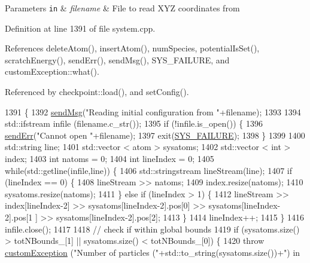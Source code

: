 \begin{DoxyParams}[1]{Parameters}
\mbox{\tt in}  & {\em filename} & File to read X\-Y\-Z coordinates from \\
\hline
\end{DoxyParams}


Definition at line 1391 of file system.\-cpp.



References delete\-Atom(), insert\-Atom(), num\-Species, potential\-Is\-Set(), scratch\-Energy(), send\-Err(), send\-Msg(), S\-Y\-S\-\_\-\-F\-A\-I\-L\-U\-R\-E, and custom\-Exception\-::what().



Referenced by checkpoint\-::load(), and set\-Config().


\begin{DoxyCode}
1391                                               \{
1392     \hyperlink{utilities_8cpp_a08974c73a5b36c28b8ad1ef47fca77b0}{sendMsg}(\textcolor{stringliteral}{"Reading initial configuration from "}+filename);
1393 
1394     std::ifstream infile (filename.c\_str());
1395     \textcolor{keywordflow}{if} (!infile.is\_open()) \{
1396         \hyperlink{utilities_8cpp_a6dacf3c3c19aa1e13a4d5a148fe5114e}{sendErr}(\textcolor{stringliteral}{"Cannot open "}+filename);
1397         exit(\hyperlink{global_8h_a428dfe1ef0a6ff4b1fdebf275f6aff2e}{SYS\_FAILURE});
1398     \}
1399 
1400     std::string line;
1401     std::vector < atom > sysatoms;
1402     std::vector < int > index;
1403     \textcolor{keywordtype}{int} natoms = 0;
1404     \textcolor{keywordtype}{int} lineIndex = 0;
1405     \textcolor{keywordflow}{while}(std::getline(infile,line)) \{
1406         std::stringstream lineStream(line);
1407         \textcolor{keywordflow}{if} (lineIndex == 0) \{
1408             lineStream >> natoms;
1409             index.resize(natoms);
1410             sysatoms.resize(natoms);
1411         \} \textcolor{keywordflow}{else} \textcolor{keywordflow}{if} (lineIndex > 1) \{
1412             lineStream >> index[lineIndex-2] >> sysatoms[lineIndex-2].pos[0] >> sysatoms[lineIndex-2].pos[1
      ] >> sysatoms[lineIndex-2].pos[2];
1413         \}
1414         lineIndex++;
1415     \}
1416     infile.close();
1417 
1418     \textcolor{comment}{// check if within global bounds}
1419     \textcolor{keywordflow}{if} (sysatoms.size() > totNBounds\_[1] || sysatoms.size() < totNBounds\_[0]) \{
1420         \textcolor{keywordflow}{throw} \hyperlink{classcustom_exception}{customException} (\textcolor{stringliteral}{"Number of particles ("}+std::to\_string(sysatoms.size())+\textcolor{stringliteral}{") in
}
\end{DoxyCode}
